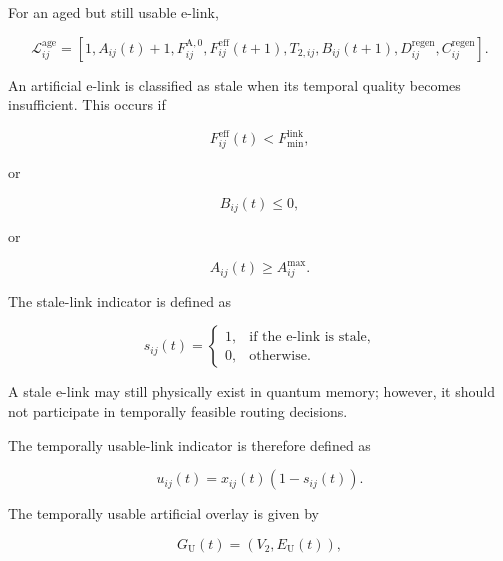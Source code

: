 For an aged but still usable e-link,

\begin{equation}
    \mathcal{L}_{ij}^{\mathrm{age}}
    =
    \left[
    1,
    A_{ij}(t)+1,
    F_{ij}^{\mathrm{A},0},
    F_{ij}^{\mathrm{eff}}(t+1),
    T_{2,ij},
    B_{ij}(t+1),
    D_{ij}^{\mathrm{regen}},
    C_{ij}^{\mathrm{regen}}
    \right].
\end{equation}

An artificial e-link is classified as stale when its temporal quality becomes insufficient. This occurs if

\begin{equation}
    F_{ij}^{\mathrm{eff}}(t)
    <
   F_{\min}^{\mathrm{link}},
\end{equation}

or

\begin{equation}
    B_{ij}(t)
    \leq 0,
\end{equation}

or

\begin{equation}
    A_{ij}(t)
    \geq
    A_{ij}^{\max}.
\end{equation}

The stale-link indicator is defined as

\begin{equation}
    s_{ij}(t)
    =
    \begin{cases}
        1, & \text{if the e-link is stale},\\
        0, & \text{otherwise}.
    \end{cases}
\end{equation}

A stale e-link may still physically exist in quantum memory; however, it should not participate in temporally feasible routing decisions.

The temporally usable-link indicator is therefore defined as

\begin{equation}
    u_{ij}(t)
    =
    x_{ij}(t)
    \left(
    1-s_{ij}(t)
    \right).
\end{equation}

The temporally usable artificial overlay is given by

\begin{equation}
    G_{\mathrm{U}}(t)
    =
    \left(
    V_2,
    E_{\mathrm{U}}(t)
    \right),
\end{equation}

